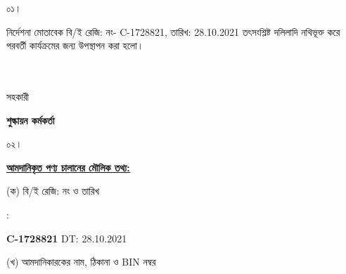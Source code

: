 \documentclass[12pt]{article}
\newcommand{\beno}{C-1728821}
\newcommand{\bedt}{28.10.2021}
\begin{document}
\noindent
\begin{minipage}[t]{0.05\linewidth}
০১।
\end{minipage}
\begin{minipage}[t]{0.95\linewidth}
নির্দেশনা মোতাবেক বি/ই রেজি: নং- {\beno}, তারিখ: {\bedt}
তৎসংশ্লিষ্ট দলিলাদি নথিভূক্ত করে
পরবর্তী কার্যক্রমের জন্য উপস্থাপন করা হলো।
\\
\\
\\
\end{minipage}
\begin{minipage}[t]{0.05\linewidth}
\hspace*{1em}
\end{minipage}
\begin{minipage}[t]{0.05\linewidth}
সহকারী
\end{minipage}
\begin{minipage}[t]{0.40\linewidth}
\hspace{1em}
\end{minipage}
\begin{minipage}[t]{0.50\linewidth}
\textbf{শুল্কায়ন কর্মকর্তা}
\\
\end{minipage}
\begin{minipage}[t]{0.05\linewidth}
০২।
\end{minipage}
\begin{minipage}[t]{0.95\linewidth}
\underline{\textbf {আমদানিকৃত পণ্য চালানের
মৌলিক তথ্য:}}
\\
\end{minipage}
\footnotesize
\begin{minipage}[t]{0.05\linewidth}
\hspace*{1em}
\end{minipage}
\begin{minipage}[t]{0.45\linewidth}
(ক) বি/ই রেজি: নং ও তারিখ
\end{minipage}
\begin{minipage}[t]{0.02\linewidth}
:
\end{minipage}
\begin{minipage}[t]{0.50\linewidth}
\textbf{{\beno}} \hspace{2em} DT: {\bedt}
\\
\end{minipage}
\begin{minipage}[t]{0.05\linewidth}
\hspace*{1em}
\end{minipage}
\begin{minipage}[t]{0.45\linewidth}
(খ) আমদানিকারকের নাম, ঠিকানা
ও BIN নম্বর
\end{minipage}
\end{document}
